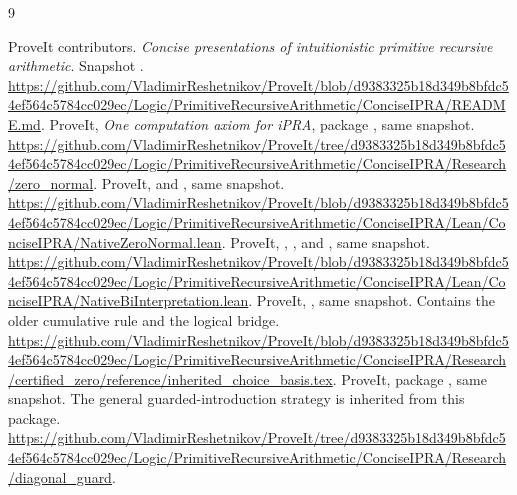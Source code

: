 \clearpage
\begin{thebibliography}{9}
\raggedright
{}
ProveIt contributors. \emph{Concise presentations of intuitionistic
primitive recursive arithmetic}. Snapshot
.
\url{https://github.com/VladimirReshetnikov/ProveIt/blob/d9383325b18d349b8bfdc54ef564c5784cc029ec/Logic/PrimitiveRecursiveArithmetic/ConciseIPRA/README.md}.
ProveIt, \emph{One computation axiom for iPRA}, package
, same snapshot.
\url{https://github.com/VladimirReshetnikov/ProveIt/tree/d9383325b18d349b8bfdc54ef564c5784cc029ec/Logic/PrimitiveRecursiveArithmetic/ConciseIPRA/Research/zero_normal}.
ProveIt,  and
, same snapshot.
\url{https://github.com/VladimirReshetnikov/ProveIt/blob/d9383325b18d349b8bfdc54ef564c5784cc029ec/Logic/PrimitiveRecursiveArithmetic/ConciseIPRA/Lean/ConciseIPRA/NativeZeroNormal.lean}.
ProveIt, ,
, and , same snapshot.
\url{https://github.com/VladimirReshetnikov/ProveIt/blob/d9383325b18d349b8bfdc54ef564c5784cc029ec/Logic/PrimitiveRecursiveArithmetic/ConciseIPRA/Lean/ConciseIPRA/NativeBiInterpretation.lean}.
ProveIt, , same snapshot.
Contains the older cumulative rule and the logical bridge.
\url{https://github.com/VladimirReshetnikov/ProveIt/blob/d9383325b18d349b8bfdc54ef564c5784cc029ec/Logic/PrimitiveRecursiveArithmetic/ConciseIPRA/Research/certified_zero/reference/inherited_choice_basis.tex}.
ProveIt, package , same snapshot.
The general guarded-introduction strategy is inherited from this package.
\url{https://github.com/VladimirReshetnikov/ProveIt/tree/d9383325b18d349b8bfdc54ef564c5784cc029ec/Logic/PrimitiveRecursiveArithmetic/ConciseIPRA/Research/diagonal_guard}.
\end{thebibliography}

